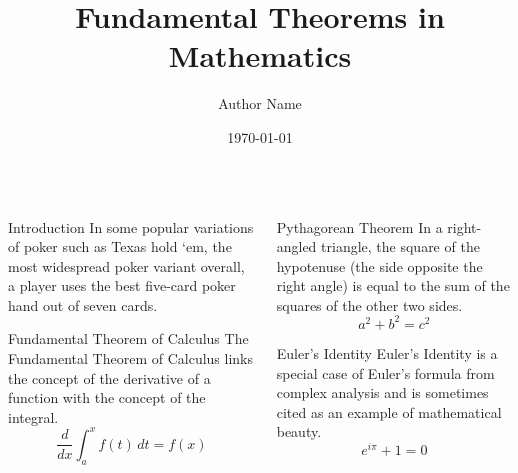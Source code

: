\documentclass[final]{beamer}
\title{Fundamental Theorems in Mathematics}
\author{Author Name}
\institute{Math Department, University X}
\date{\today}
\begin{document}
\begin{frame}[t]
\begin{columns}[t]

\begin{column}{.48\linewidth}
\begin{block}{Introduction}
    In some popular variations of poker such as Texas hold `em, 
    the most widespread poker variant overall, a player uses the best five-card poker hand out of seven cards.
\end{block}

\begin{block}{Fundamental Theorem of Calculus}
The Fundamental Theorem of Calculus links the concept of the derivative of a function with the concept of the integral.
\[
\frac{d}{dx} \int_a^x f(t)\, dt = f(x)
\]
\end{block}
\end{column}

\begin{column}{.48\linewidth}
\begin{block}{Pythagorean Theorem}
In a right-angled triangle, the square of the hypotenuse (the side opposite the right angle) is equal to the sum of the squares of the other two sides.
\[
a^2 + b^2 = c^2
\]
\end{block}

\begin{block}{Euler's Identity}
Euler's Identity is a special case of Euler's formula from complex analysis and is sometimes cited as an example of mathematical beauty.
\[
e^{i\pi} + 1 = 0
\]
\end{block}
\end{column}


\end{columns}
\end{frame}
\end{document}
